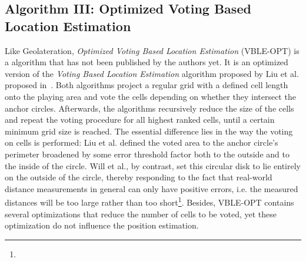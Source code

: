 \subsection{Algorithm III: Optimized Voting Based Location Estimation}
Like Geolateration, \emph{Optimized Voting Based Location Estimation} (VBLE-OPT) is a algorithm that has not been published by the authors yet. It is an optimized version of the \emph{Voting Based Location Estimation} algorithm proposed by Liu et al. proposed in~\cite{liu2005attackresistant}. Both algorithms project a regular grid with a defined cell length onto the playing area and vote the cells depending on whether they intersect the anchor circles. Afterwards, the algorithms recursively reduce the size of the cells and repeat the voting procedure for all highest ranked cells, until a certain minimum grid size is reached. The essential difference lies in the way the voting on cells is performed: Liu et al. defined the voted area to the anchor circle's perimeter broadened by some error threshold factor both to the outside and to the inside of the circle. Will et al., by contrast, set this circular disk to lie entirely on the outside of the circle, thereby responding to the fact that real-world distance measurements in general can only have positive errors, i.e. the measured distances will be too large rather than too short\footnote{}. Besides, VBLE-OPT contains several optimizations that reduce the number of cells to be voted, yet these optimization do not influence the position estimation.

